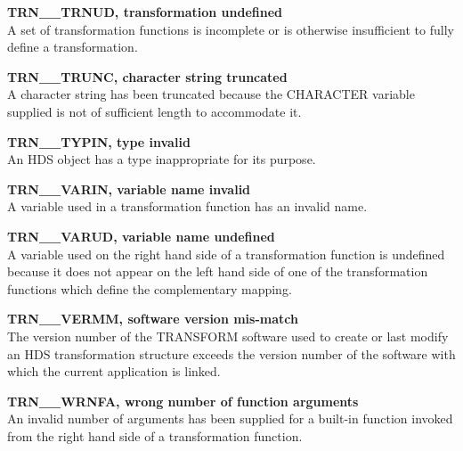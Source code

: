 \documentclass[twoside,nolof,11pt]{starlink}
\providecommand{\name}[1]{\small{#1}}
\begin{document}
\begin{description}
\item \textbf{TRN\_\_TRNUD, transformation undefined}\\
A set of transformation functions is incomplete or is otherwise insufficient
to fully define a transformation.

\item \textbf{TRN\_\_TRUNC, character string truncated}\\
A character string has been truncated because the \name{CHARACTER} variable
supplied is not of sufficient length to accommodate it.

\item \textbf{TRN\_\_TYPIN, type invalid}\\
An \name{HDS} object has a type inappropriate for its purpose.

\item \textbf{TRN\_\_VARIN, variable name invalid}\\
A variable used in a transformation function has an invalid name.

\item \textbf{TRN\_\_VARUD, variable name undefined}\\
A variable used on the right hand side of a transformation function is
undefined because it does not appear on the left hand side of one of the
transformation functions which define the complementary mapping.

\item \textbf{TRN\_\_VERMM, software version mis-match}\\
The version number of the \name{TRANSFORM} software used to create or last
modify an \name{HDS} transformation structure exceeds the version number of
the software with which the current application is linked.

\item \textbf{TRN\_\_WRNFA, wrong number of function arguments}\\
An invalid number of arguments has been supplied for a built-in function
invoked from the right hand side of a transformation function.

\end{description}
\end{document}
